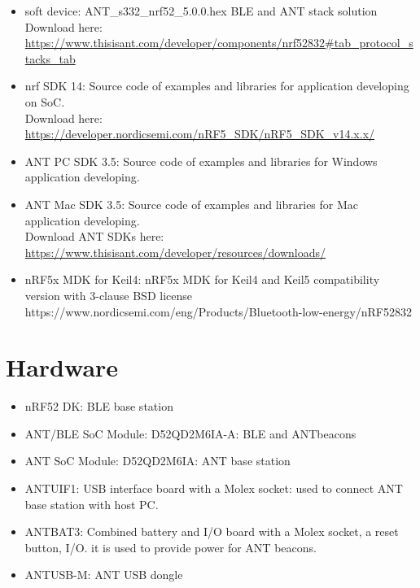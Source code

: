 \documentclass{article}
\begin{document}
\begin{itemize}
\item soft device: ANT\_s332\_nrf52\_5.0.0.hex 
 BLE and ANT stack solution \\ Download here: \url{https://www.thisisant.com/developer/components/nrf52832#tab_protocol_stacks_tab}

\item nrf SDK 14: Source code of examples and libraries for application developing on SoC. \\Download here: \url{https://developer.nordicsemi.com/nRF5_SDK/nRF5_SDK_v14.x.x/}

\item ANT PC SDK  3.5: Source code of examples and libraries for Windows application developing. 

\item ANT Mac SDK 3.5: Source code of examples and libraries for Mac application developing. \\
Download ANT SDKs here: \url{https://www.thisisant.com/developer/resources/downloads/}

\item nRF5x MDK for Keil4:  nRF5x MDK for Keil4 and Keil5 compatibility version with 3-clause BSD license
https://www.nordicsemi.com/eng/Products/Bluetooth-low-energy/nRF52832

\end{itemize}
\section{Hardware}
\begin{itemize}
\item nRF52 DK: BLE base station 
\item ANT/BLE SoC Module: D52QD2M6IA-A: BLE and ANTbeacons
\item ANT SoC Module: D52QD2M6IA: ANT base station
\item ANTUIF1: USB interface board with a Molex socket: used to connect ANT base station with host PC.
\item ANTBAT3: Combined battery and I/O board with a Molex socket, a reset button, I/O. it is used to provide power for ANT beacons.
\item ANTUSB-M: ANT USB dongle
\end{itemize}
\end{document}
